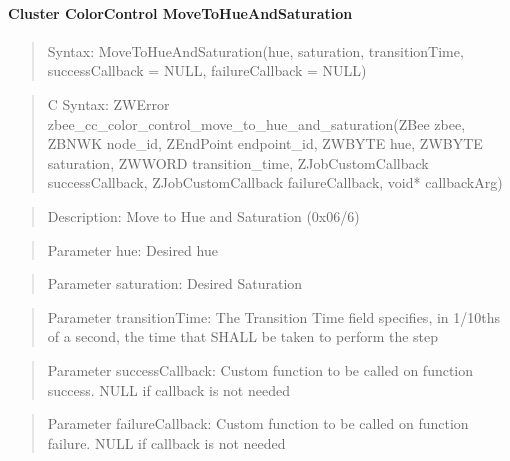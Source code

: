 \paragraph{Cluster ColorControl MoveToHueAndSaturation}
\begin{quote}Syntax: MoveToHueAndSaturation(hue, saturation, transitionTime, successCallback = NULL, failureCallback = NULL)\end{quote}
\begin{quote}C Syntax: ZWError zbee\_cc\_color\_control\_move\_to\_hue\_and\_saturation(ZBee zbee, ZBNWK node\_id, ZEndPoint endpoint\_id, ZWBYTE hue, ZWBYTE saturation, ZWWORD transition\_time, ZJobCustomCallback successCallback, ZJobCustomCallback failureCallback, void* callbackArg)\end{quote}
\begin{quote}Description: Move to Hue and Saturation (0x06/6)\end{quote}
\begin{quote}Parameter hue: Desired hue\end{quote}
\begin{quote}Parameter saturation: Desired Saturation\end{quote}
\begin{quote}Parameter transitionTime: The Transition Time field specifies, in 1/10ths of a second, the time that SHALL be taken to perform the step\end{quote}
\begin{quote}Parameter successCallback: Custom function to be called on function success. NULL if callback is not needed\end{quote}
\begin{quote}Parameter failureCallback: Custom function to be called on function failure. NULL if callback is not needed\end{quote}


